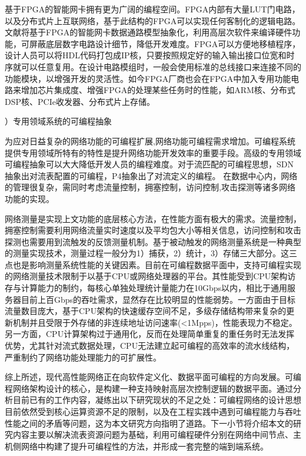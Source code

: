 基于FPGA的智能网卡拥有更为广阔的编程空间。FPGA内部有大量LUT门电路，以及分布式片上互联网络，基于此结构的FPGA可以实现任何客制化的逻辑电路。文献\cite{wang2017p4fpga}将基于FPGA的智能网卡数据通路模型抽象化，利用高层次软件来编译硬件功能，可屏蔽底层数字电路设计细节，降低开发难度。FPGA可以方便地移植程序，设计人员可以将HDL代码打包成IP核，只要按照规定好的输入输出接口位宽和时序就可以任意复用。在设计电路模组时，一般会使用标准的总线接口来连接不同的功能模块，以增强开发的灵活性。如今FPGA厂商也会在FPGA中加入专用功能电路来增加芯片集成度、增强FPGA的处理某些任务时的性能，如ARM核、分布式DSP核、PCIe收发器、分布式片上存储。

{）专用领域系统的可编程抽象}



为应对日益复杂的网络功能的可编程扩展,网络功能可编程需求增加。可编程系统提供专用领域所特有的特性是提升网络功能开发效率的重要手段。高级的专用领域可编程抽象可以大大降低开发人员的编程难度。对于流匹配的可编程思想，SDN抽象出对流表配置的可编程，P4抽象出了对流定义的编程。
在数据中心内，网络的管理很复杂，需同时考虑流量控制，拥塞控制，访问控制,攻击探测等诸多网络功能的实现。



网络测量是实现上文功能的底层核心方法，在性能方面有极大的需求。流量控制，拥塞控制需要利用网络流量实时速度以及平均包大小等相关信息，访问控制和攻击探测也需要用到流触发的反馈测量机制。基于被动触发的网络测量系统是一种典型的测量实现技术，测量过程一般分为1）捕获，2）统计，3）存储三大部分。这三点也是影响测量系统性能的关键因素。目前在可编程数据平面中，支持可编程实现的网络测量技术限制于以基于CPU或网络处理器的平台。其性能受到CPU架构访存与计算能力的制约，每核心单独处理统计量能力在10Gbps以内，相比于通用服务器目前上百Gbps的吞吐需求，显然存在比较明显的性能弱势。一方面由于目标流量数目庞大，基于CPU架构的快速缓存空间不足，多级存储结构带来复杂的更新机制并且受限于外存储的非连续地址访问速率(<1Mpps)，性能表现力不稳定。另一方面，CPU计算架构过于通用化，反而在处理简单重复的重任务时无法发挥优势，尤其针对流式数据处理，CPU无法建立起可编程的高效率的流水线结构，严重制约了网络功能处理能力的可扩展性。


综上所述，现代高性能网络正在向软件定义化、数据平面可编程的方向发展。可编程网络架构设计的核心，是构建一种支持映射高层次控制逻辑的数据平面。通过分析目前已有的工作内容，凝练出以下研究现状的不足之处：可编程网络的设计思想目前依然受到核心运算资源不足的限制，以及在工程实践中遇到可编程能力与吞吐性能之间的矛盾等问题，这为本文研究方向指明了道路。下一小节将介绍本文的研究内容主要以解决流表资源问题为基础，利用可编程硬件分别在网络中间节点、主机侧网络中构建了提升可编程性的方法，并形成一套完整的端到端系统。


